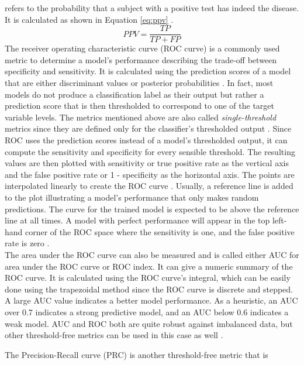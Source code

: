 refers to the probability that a subject with a positive test has indeed the 
disease. It is calculated as shown in Equation \ref{eq:ppv} \cite{RN168}.
\begin{equation}
 PPV = \frac{TP}{TP+FP}
 \label{eq:ppv}
\end{equation}
The receiver operating characteristic curve (ROC curve) is a commonly used 
metric to determine a model's performance describing the trade-off between 
specificity and sensitivity. It is calculated using the prediction scores of a 
model that are either discriminant values or posterior 
probabilities \cite{RN161}. In fact, most models do not produce a 
classification label as their output but rather a prediction score that is then 
thresholded to correspond to one of the target variable levels. The metrics 
mentioned above are also called \textit{single-threshold} metrics since they 
are defined only for the classifier's thresholded output \cite{RN161, RN167}. 
Since ROC uses the prediction scores instead of a model's thresholded output, 
it can compute the sensitivity and specificity for every sensible threshold. 
The resulting values are then plotted with sensitivity or true positive rate as 
the vertical axis and the false positive rate or 1 - specificity as the 
horizontal axis. The points are interpolated linearly to create the ROC curve  
\cite{RN161}. Usually, a reference line is added to the plot illustrating a 
model's performance that only makes random predictions. The curve for the 
trained model is expected to be above the reference line at all times. 
A model with perfect performance will appear in the top left-hand corner 
of the ROC space where the sensitivity is one, and the false positive rate is 
zero \cite{RN167, RN159}.
\\
The area under the ROC curve can also be measured and is called either AUC for 
area under the ROC curve or ROC index. It can give a numeric summary of the 
ROC curve. It is calculated using the ROC curve's integral, which can be easily 
done using the trapezoidal method since the ROC curve is discrete and stepped. 
A large AUC value indicates a better model performance. As a heuristic, an 
AUC over 0.7 indicates a strong predictive model, and an AUC below 0.6 
indicates 
a weak model. AUC and ROC both are quite robust against imbalanced data, but 
other threshold-free metrics can be used in this case as 
well \cite{RN167, RN159}.
\par
The Precision-Recall curve (PRC) is another threshold-free metric that is 

